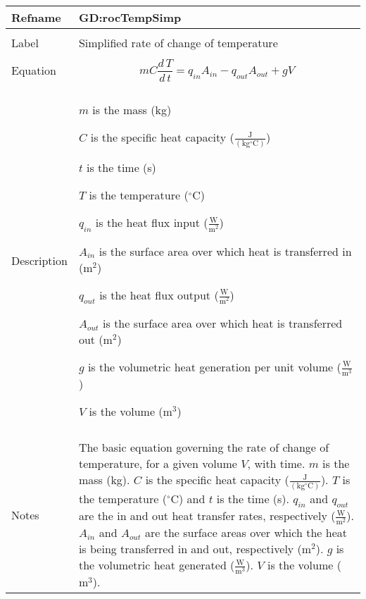 \documentclass[12pt]{article}
\begin{document}
~\newline
\noindent \begin{minipage}{\textwidth}
\begin{tabular}{p{} p{}}
\toprule \textbf{Refname} & \textbf{GD:rocTempSimp}
\label{GD:rocTempSimp}
\\ \midrule \\
Label & Simplified rate of change of temperature
\\ \midrule \\
Equation & \begin{dmath}
           m C \frac{d\,T}{d\,t}={q_{in}} {A_{in}}-{q_{out}} {A_{out}}+g V
           \end{dmath}
\\ \midrule \\
Description & \begin{symbDescription}
              \item{$m$ is the mass (kg)}
              \item{$C$ is the specific heat capacity ($\frac{\text{J}}{(\text{kg}{}^{\circ}\text{C})}$)}
              \item{$t$ is the time (s)}
              \item{$T$ is the temperature (${}^{\circ}$C)}
              \item{${q_{in}}$ is the heat flux input ($\frac{\text{W}}{\text{m}^{2}}$)}
              \item{${A_{in}}$ is the surface area over which heat is transferred in ($\text{m}^{2}$)}
              \item{${q_{out}}$ is the heat flux output ($\frac{\text{W}}{\text{m}^{2}}$)}
              \item{${A_{out}}$ is the surface area over which heat is transferred out ($\text{m}^{2}$)}
              \item{$g$ is the volumetric heat generation per unit volume ($\frac{\text{W}}{\text{m}^{3}}$)}
              \item{$V$ is the volume ($\text{m}^{3}$)}
              \end{symbDescription}
\\ \midrule \\
Notes & The basic equation governing the rate of change of temperature, for a given volume $V$, with time. $m$ is the mass (kg). $C$ is the specific heat capacity ($\frac{\text{J}}{(\text{kg}{}^{\circ}\text{C})}$). $T$ is the temperature (${}^{\circ}$C) and $t$ is the time (s). ${q_{in}}$ and ${q_{out}}$ are the in and out heat transfer rates, respectively ($\frac{\text{W}}{\text{m}^{2}}$). ${A_{in}}$ and ${A_{out}}$ are the surface areas over which the heat is being transferred in and out, respectively ($\text{m}^{2}$). $g$ is the volumetric heat generated ($\frac{\text{W}}{\text{m}^{3}}$). $V$ is the volume ($\text{m}^{3}$).

\end{tabular}
\end{minipage}
\end{document}
